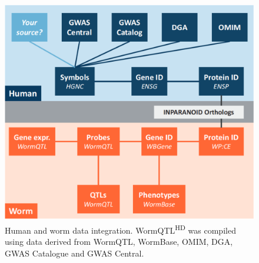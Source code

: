 \begin{figure}
	\includegraphics[scale=0.4]{img/wormqtl_mapping}
	\caption[Human and worm data integration]{Human and worm data integration. WormQTL\textsuperscript{HD} was compiled using data derived from WormQTL, WormBase, OMIM, DGA, GWAS Catalogue and GWAS Central.}
	\label{fig:wormqtl_mapping}
\end{figure}


